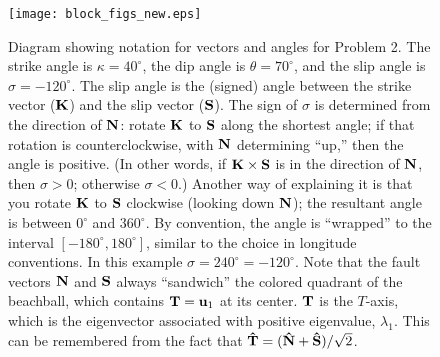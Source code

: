 \begin{figure}
\centering
\texttt{[image: block\_figs\_new.eps]}
\caption[]
{{
Diagram showing notation for vectors and angles for Problem 2.
The strike angle is $\kappa = 40^\circ$, the dip angle is $\theta = 70^\circ$, and the slip angle is $\sigma = -120^\circ$.
The slip angle is the (signed) angle between the strike vector ($\mbox{${\bf K}$}$) and the slip vector ($\mbox{${\bf S}$}$).
The sign of $\sigma$ is determined from the direction of $\mbox{${\bf N}$}$: rotate $\mbox{${\bf K}$}$ to $\mbox{${\bf S}$}$ along the shortest angle; if that rotation is counterclockwise, with $\mbox{${\bf N}$}$ determining ``up,'' then the angle is positive. (In other words, if $\mbox{${\bf K}$} \times \mbox{${\bf S}$}$ is in the direction of $\mbox{${\bf N}$}$, then $\sigma > 0$; otherwise $\sigma < 0$.)
Another way of explaining it is that you rotate $\mbox{${\bf K}$}$ to $\mbox{${\bf S}$}$ clockwise (looking down $\mbox{${\bf N}$}$); the resultant angle is between $0^\circ$ and $360^\circ$. By convention, the angle is ``wrapped'' to the interval $[-180^\circ, 180^\circ]$, similar to the choice in longitude conventions. In this example $\sigma = 240^\circ = -120^\circ$.
Note that the fault vectors $\mbox{${\bf N}$}$ and $\mbox{${\bf S}$}$ always ``sandwich'' the colored quadrant of the beachball, which contains $\mbox{${\bf T}$} = \mbox{${\bf u}$}_1$ at its center.
$\mbox{${\bf T}$}$ is the $T$-axis, which is the eigenvector associated with positive eigenvalue, $\lambda_1$.
This can be remembered from the fact that $\mbox{\boldmath{$\hat{\rm T}$}} = (\mbox{\boldmath{$\hat{\rm N}$}} + \mbox{\boldmath{$\hat{\rm S}$}})/\sqrt{2}$.
\label{fig:cmt}
}}
\end{figure}
